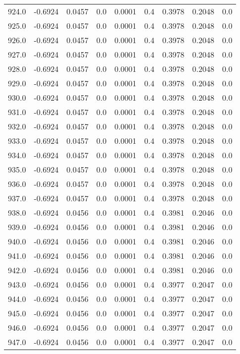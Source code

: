 \begin{longtable}{lrrrrrrrr}
924.0 & -0.6924 & 0.0457 & 0.0 & 0.0001 & 0.4 & 0.3978 & 0.2048 & 0.0 \\
925.0 & -0.6924 & 0.0457 & 0.0 & 0.0001 & 0.4 & 0.3978 & 0.2048 & 0.0 \\
926.0 & -0.6924 & 0.0457 & 0.0 & 0.0001 & 0.4 & 0.3978 & 0.2048 & 0.0 \\
927.0 & -0.6924 & 0.0457 & 0.0 & 0.0001 & 0.4 & 0.3978 & 0.2048 & 0.0 \\
928.0 & -0.6924 & 0.0457 & 0.0 & 0.0001 & 0.4 & 0.3978 & 0.2048 & 0.0 \\
929.0 & -0.6924 & 0.0457 & 0.0 & 0.0001 & 0.4 & 0.3978 & 0.2048 & 0.0 \\
930.0 & -0.6924 & 0.0457 & 0.0 & 0.0001 & 0.4 & 0.3978 & 0.2048 & 0.0 \\
931.0 & -0.6924 & 0.0457 & 0.0 & 0.0001 & 0.4 & 0.3978 & 0.2048 & 0.0 \\
932.0 & -0.6924 & 0.0457 & 0.0 & 0.0001 & 0.4 & 0.3978 & 0.2048 & 0.0 \\
933.0 & -0.6924 & 0.0457 & 0.0 & 0.0001 & 0.4 & 0.3978 & 0.2048 & 0.0 \\
934.0 & -0.6924 & 0.0457 & 0.0 & 0.0001 & 0.4 & 0.3978 & 0.2048 & 0.0 \\
935.0 & -0.6924 & 0.0457 & 0.0 & 0.0001 & 0.4 & 0.3978 & 0.2048 & 0.0 \\
936.0 & -0.6924 & 0.0457 & 0.0 & 0.0001 & 0.4 & 0.3978 & 0.2048 & 0.0 \\
937.0 & -0.6924 & 0.0457 & 0.0 & 0.0001 & 0.4 & 0.3978 & 0.2048 & 0.0 \\
938.0 & -0.6924 & 0.0456 & 0.0 & 0.0001 & 0.4 & 0.3981 & 0.2046 & 0.0 \\
939.0 & -0.6924 & 0.0456 & 0.0 & 0.0001 & 0.4 & 0.3981 & 0.2046 & 0.0 \\
940.0 & -0.6924 & 0.0456 & 0.0 & 0.0001 & 0.4 & 0.3981 & 0.2046 & 0.0 \\
941.0 & -0.6924 & 0.0456 & 0.0 & 0.0001 & 0.4 & 0.3981 & 0.2046 & 0.0 \\
942.0 & -0.6924 & 0.0456 & 0.0 & 0.0001 & 0.4 & 0.3981 & 0.2046 & 0.0 \\
943.0 & -0.6924 & 0.0456 & 0.0 & 0.0001 & 0.4 & 0.3977 & 0.2047 & 0.0 \\
944.0 & -0.6924 & 0.0456 & 0.0 & 0.0001 & 0.4 & 0.3977 & 0.2047 & 0.0 \\
945.0 & -0.6924 & 0.0456 & 0.0 & 0.0001 & 0.4 & 0.3977 & 0.2047 & 0.0 \\
946.0 & -0.6924 & 0.0456 & 0.0 & 0.0001 & 0.4 & 0.3977 & 0.2047 & 0.0 \\
947.0 & -0.6924 & 0.0456 & 0.0 & 0.0001 & 0.4 & 0.3977 & 0.2047 & 0.0 \\

\end{longtable}
